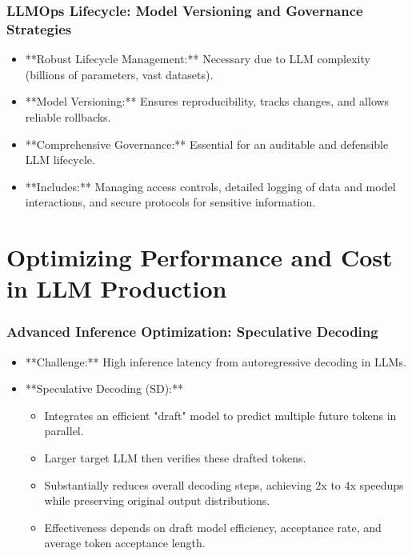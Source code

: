 \documentclass{beamer}       %
\begin{document}
\begin{frame}
    \frametitle{LLMOps Lifecycle: Model Versioning and Governance Strategies}
    \begin{itemize}
        \item **Robust Lifecycle Management:** Necessary due to LLM complexity (billions of parameters, vast datasets).
        \item **Model Versioning:** Ensures reproducibility, tracks changes, and allows reliable rollbacks.
        \item **Comprehensive Governance:** Essential for an auditable and defensible LLM lifecycle.
        \item **Includes:** Managing access controls, detailed logging of data and model interactions, and secure protocols for sensitive information.
    \end{itemize}
\end{frame}

\section{Optimizing Performance and Cost in LLM Production}

\begin{frame}
    \frametitle{Advanced Inference Optimization: Speculative Decoding}
    \begin{itemize}
        \item **Challenge:** High inference latency from autoregressive decoding in LLMs.
        \item **Speculative Decoding (SD):**
        \begin{itemize}
            \item Integrates an efficient "draft" model to predict multiple future tokens in parallel.
            \item Larger target LLM then verifies these drafted tokens.
            \item Substantially reduces overall decoding steps, achieving 2x to 4x speedups while preserving original output distributions.
            \item Effectiveness depends on draft model efficiency, acceptance rate, and average token acceptance length.
        \end{itemize}
    \end{itemize}
\end{frame}
\end{document}
